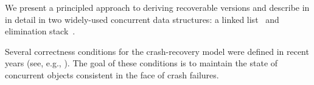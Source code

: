 We present a principled approach to deriving recoverable versions
and describe in in detail in two widely-used concurrent data structures:
a linked list~\cite{} and elimination stack~\cite{}.

Several correctness conditions for the crash-recovery model were
defined in recent years (see, e.g., \cite{Aguilera2003StrictLA,GolabR16,DBLP:conf/opodis/BerryhillGT15,DBLP:conf/icdcs/GuerraouiL04,DBLP:conf/wdag/IzraelevitzMS16}). The goal of these conditions is to maintain the state of concurrent objects
consistent in the face of crash failures.
